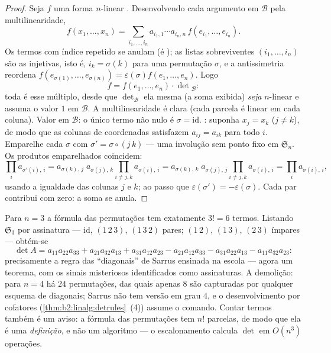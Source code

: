 \begin{proof}
Seja $f$ uma forma $n$-linear . Desenvolvendo cada argumento em
$\mathcal{B}$ pela multilinearidade,
\[
f(x_1, \dots, x_n)
= \sum_{i_1, \dots, i_n} a_{i_1,1}\cdots a_{i_n,n}\,
f(e_{i_1}, \dots, e_{i_n}).
\]
Os termos com índice repetido se anulam (é ); as
listas sobreviventes $(i_1, \dots, i_n)$ são as injetivas, isto é, $i_k =
\sigma(k)$ para uma permutação $\sigma$, e a antissimetria reordena
$f(e_{\sigma(1)}, \dots, e_{\sigma(n)}) = \varepsilon(\sigma)
f(e_1, \dots, e_n)$. Logo
\[
f = f(e_1, \dots, e_n) \cdot \det{}_{\mathcal{B}} :
\]
toda  é esse múltiplo, desde que
$\det_{\mathcal{B}}$ ela mesma (a soma exibida) \emph{seja}
$n$-linear  e assuma o valor $1$ em $\mathcal B$.
A multilinearidade é clara (cada parcela é linear em cada coluna).
Valor em $\mathcal B$: o único termo não nulo é $\sigma =
\mathrm{id}$. : suponha $x_j = x_k$ ($j \neq k$), de modo
que as colunas de coordenadas satisfazem $a_{i j} = a_{i k}$ para todo
$i$. Emparelhe cada $\sigma$ com $\sigma' = \sigma\circ(j\,k)$ ---
uma involução sem ponto fixo em $\mathfrak{S}_n$. Os
produtos emparelhados coincidem:
\[
\prod_i a_{\sigma'(i),\,i}
= a_{\sigma(k),\,j}\; a_{\sigma(j),\,k}
\prod_{i \neq j,k} a_{\sigma(i),\,i}
= a_{\sigma(k),\,k}\; a_{\sigma(j),\,j}
\prod_{i \neq j,k} a_{\sigma(i),\,i}
= \prod_i a_{\sigma(i),\,i},
\]
usando a igualdade das colunas $j$ e $k$; ao passo que
$\varepsilon(\sigma') = -\varepsilon(\sigma)$. Cada par
contribui com zero: a soma se anula.
\end{proof}

\begin{example}\label{ex:b2:linalg:sarrus}
Para $n = 3$ a fórmula das permutações tem exatamente $3! = 6$ termos.
Listando $\mathfrak{S}_3$ por assinatura ---
$\mathrm{id}$, $(1\,2\,3)$, $(1\,3\,2)$ pares;
$(1\,2)$, $(1\,3)$, $(2\,3)$ ímpares --- obtém-se
\[
\det A = a_{11}a_{22}a_{33} + a_{21}a_{32}a_{13} +
a_{31}a_{12}a_{23}
- a_{21}a_{12}a_{33} - a_{31}a_{22}a_{13} -
a_{11}a_{32}a_{23} :
\]
precisamente a regra das ``diagonais'' de Sarrus ensinada na escola ---
agora um teorema, com os sinais misteriosos identificados como
assinaturas. A demolição: para $n = 4$ há $24$
permutações, das quais apenas $8$ são capturadas por qualquer
esquema de diagonais; Sarrus não tem versão em grau $4$, e o
desenvolvimento por cofatores (\cref{thm:b2:linalg:detrules}~(4)) assume
o comando. Contar termos também é um aviso: a fórmula das permutações
tem $n!$ parcelas, de modo que ela é uma \emph{definição}, e não um
algoritmo --- o escalonamento calcula $\det$ em $O(n^3)$
operações.
\end{example}

